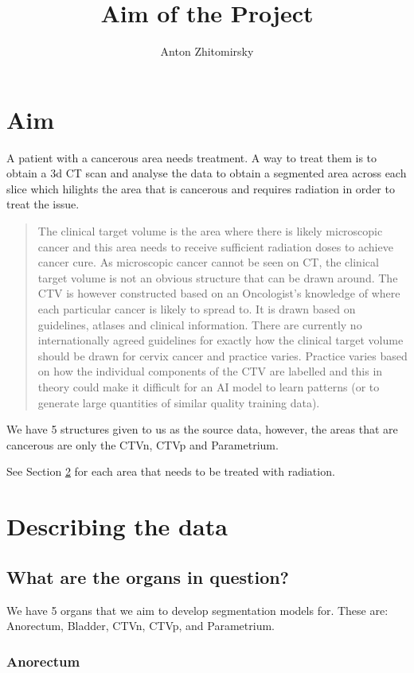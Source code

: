 \documentclass[11pt]{article}
\title{Aim of the Project}
\author{Anton Zhitomirsky}
\begin{document}
\section{Aim}

A patient with a cancerous area needs treatment. A way to treat them is to obtain a 3d CT scan and analyse the data to obtain a segmented area across each slice which hilights the area that is cancerous and requires radiation in order to treat the issue.

\begin{quote}
    The clinical target volume is the area where there is likely microscopic cancer and this area needs to receive sufficient radiation doses to achieve cancer cure. As microscopic cancer cannot be seen on CT, the clinical target volume is not an obvious structure that can be drawn around. The CTV is however constructed based on an Oncologist's knowledge of where each particular cancer is likely to spread to. It is drawn based on guidelines, atlases and clinical information. There are currently no internationally agreed guidelines for exactly how the clinical target volume should be drawn for cervix cancer and practice varies. Practice varies based on how the individual components of the CTV are labelled and this in theory could make it difficult for an AI model to learn patterns (or to generate large quantities of similar quality training data).\cite{AMLART-data}
\end{quote}

We have 5 structures given to us as the source data, however, the areas that are cancerous are only the CTVn, CTVp and Parametrium. 

See Section \ref{ref:DescribingTheData} for each area that needs to be treated with radiation.

\section{Describing the data}\label{ref:DescribingTheData}

\subsection{What are the organs in question?}

We have 5 organs that we aim to develop segmentation models for. These are: Anorectum, Bladder, CTVn, CTVp, and Parametrium.

\subsubsection{Anorectum}
\end{document}
